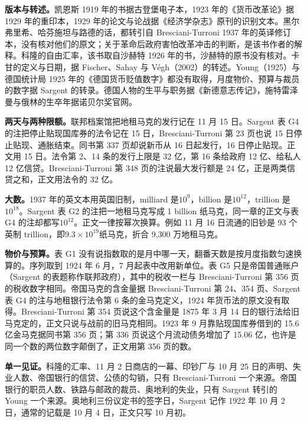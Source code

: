 \begin{deeper}[史料说明]
\textbf{版本与转述。}凯恩斯 1919 年的书据古登堡电子本，1923 年的《货币改革论》据 1929 年的重印本，1929 年的论文与论战据《经济学杂志》原刊的识别文本。黑尔弗里希、哈芬施坦与路德的话，都转引自 Bresciani-Turroni 1937 年的英译修订本，没有核对他们的原文；关于革命后政府害怕改革冲击的判断，是该书作者的解释。科隆的自由汇率，该书取自沙赫特 1926 年的书，沙赫特的原书没有核对。卡甘的定义与日期，据 Fischer、Sahay 与 Végh（2002）的转述。Young（1925）与德国统计局 1925 年的《德国货币贬值数字》都没有取得，月度物价、预算与裁员的数字据 Sargent 的转录。德国人物的生平与职务据《新德意志传记》，施特雷泽曼与俄林的生卒年据诺贝尔奖官网。

\textbf{两天与两种限额。}联邦档案馆把地租马克的发行记在 11 月 15 日。Sargent 表 G4 的注把停止贴现国库券的法令记在 15 日，Bresciani-Turroni 第 23 页也说 15 日停止贴现、通胀结束。同书第 337 页却说新币从 16 日起发行，16 日停止贴现。正文用 15 日。法令第 2、14 条的发行上限是 32 亿，第 16 条给政府 12 亿、给私人 12 亿信贷。Bresciani-Turroni 第 348 页的注说最大发行额是 24 亿，正是两类信贷之和，正文用法令的 32 亿。

\textbf{大数。}1937 年的英文本用英国旧制，milliard 是$10^9$，billion 是$10^{12}$，trillion 是$10^{18}$。Sargent 表 G2 的注把一地租马克写成 1 billion 纸马克，同一章的正文与表 G4 的注却都写$10^{12}$。正文一律按幂次换算。例如 11 月 16 日流通的旧钞是 93 个英制 trillion，即$9.3\times10^{19}$纸马克，折合 9,300 万地租马克。

\textbf{物价与预算。}表 G1 没有说指数取的是月中哪一天，翻番天数是按月度指数匀速换算的。序列取到 1924 年 6 月，7 月起表中改用新单位。表 G5 只是帝国普通账户（Sargent 的表题称作联邦政府），其中的税收一栏与 Bresciani-Turroni 第 356 页的税收数字相同。帝国马克的含金量据 Bresciani-Turroni 第 24、354 页、Sargent 表 G4 的注与地租银行法令第 6 条的金马克定义，1924 年货币法的原文没有取得。Bresciani-Turroni 第 354 页说这个含金量是 1875 年 3 月 14 日的银行法给旧马克定的，正文只说与战前的旧马克相同。1923 年 9 月靠贴现国库券借到的 15.6 亿金马克据同书第 356 页；第 336 页说这个月流动债务增加了 15.06 亿，也许是同一个数的两位数字颠倒了，正文用第 356 页的数。

\textbf{单一见证。}科隆的汇率、11 月 2 日商店的一幕、印钞厂与 10 月 25 日的声明、失业人数、帝国银行的信贷、公债的勾销，只有 Bresciani-Turroni 一个来源。帝国银行的职员人数、铁路与邮政的裁员、奥地利的失业，只有 Sargent 转引的 Young 一个来源。奥地利三份议定书的签字日，Sargent 记作 1922 年 10 月 2 日，通常的记载是 10 月 4 日，正文只写 10 月初。
\end{deeper}

